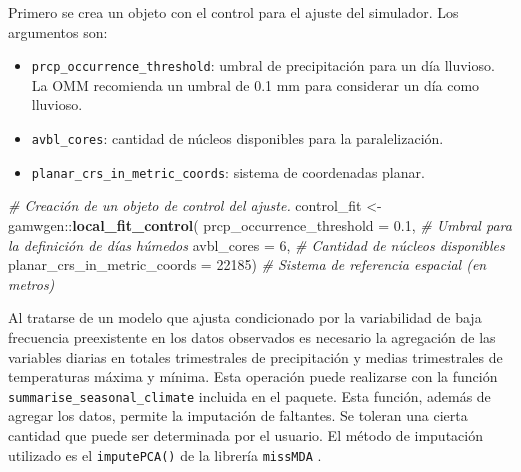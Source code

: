 \documentclass[
  12pt]{article}
\newenvironment{Shaded}{}{}
\newcommand{\CommentTok}[1]{\textcolor[rgb]{0.38,0.63,0.69}{\textit{#1}}}
\newcommand{\DataTypeTok}[1]{\textcolor[rgb]{0.56,0.13,0.00}{#1}}
\newcommand{\DecValTok}[1]{\textcolor[rgb]{0.25,0.63,0.44}{#1}}
\newcommand{\FloatTok}[1]{\textcolor[rgb]{0.25,0.63,0.44}{#1}}
\newcommand{\KeywordTok}[1]{\textcolor[rgb]{0.00,0.44,0.13}{\textbf{#1}}}
\newcommand{\NormalTok}[1]{#1}
\newcommand{\OperatorTok}[1]{\textcolor[rgb]{0.40,0.40,0.40}{#1}}
\newcommand{\StringTok}[1]{\textcolor[rgb]{0.25,0.44,0.63}{#1}}
\providecommand{\tightlist}{%
  \setlength{\itemsep}{0pt}\setlength{\parskip}{0pt}}
\begin{document}
Primero se crea un objeto con el control para el ajuste del simulador. Los argumentos son:

\begin{itemize}
\tightlist
\item
  \texttt{prcp\_occurrence\_threshold}: umbral de precipitación para un día lluvioso. La OMM recomienda un umbral de 0.1 mm para considerar un día como lluvioso.
\item
  \texttt{avbl\_cores}: cantidad de núcleos disponibles para la paralelización.
\item
  \texttt{planar\_crs\_in\_metric\_coords}: sistema de coordenadas planar.
\end{itemize}

\begin{Shaded}
\begin{Highlighting}[]
\CommentTok{# Creación de un objeto de control del ajuste.}
\NormalTok{control_fit <-gamwgen}\OperatorTok{::}\KeywordTok{local_fit_control}\NormalTok{(}
  \DataTypeTok{prcp_occurrence_threshold =} \FloatTok{0.1}\NormalTok{, }
  \CommentTok{# Umbral para la definición de días húmedos}
  \DataTypeTok{avbl_cores =} \DecValTok{6}\NormalTok{, }
  \CommentTok{# Cantidad de núcleos disponibles}
  \DataTypeTok{planar_crs_in_metric_coords =} \DecValTok{22185}\NormalTok{) }
 \CommentTok{# Sistema de referencia espacial (en metros)}
\end{Highlighting}
\end{Shaded}

Al tratarse de un modelo que ajusta condicionado por la variabilidad de baja frecuencia preexistente en los datos observados es necesario la agregación de las variables diarias en totales trimestrales de precipitación y medias trimestrales de temperaturas máxima y mínima. Esta operación puede realizarse con la función \texttt{summarise\_seasonal\_climate} incluida en el paquete.
Esta función, además de agregar los datos, permite la imputación de faltantes. Se toleran una cierta cantidad que puede ser determinada por el usuario. El método de imputación utilizado es el \texttt{imputePCA()} de la librería \texttt{missMDA} .

\begin{Shaded}
\end{Shaded}
\end{document}
